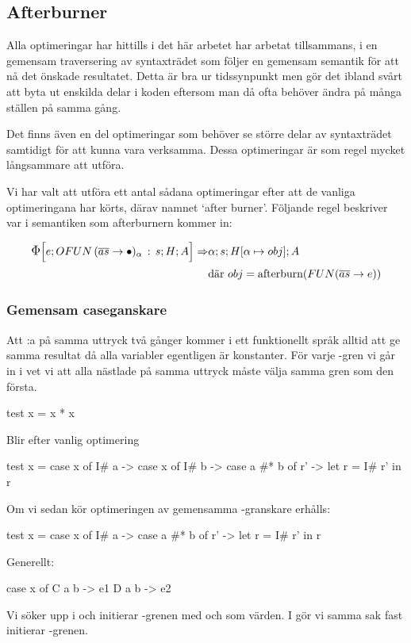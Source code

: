 \documentclass[../Optimise]{subfiles}
\begin{document}
\subsection{Afterburner}

Alla optimeringar har hittills i det här arbetet har arbetat tillsammans, i en gemensam
traversering av syntaxträdet som följer en gemensam semantik för att nå det önskade resultatet. 
Detta är bra ur tidssynpunkt men gör det ibland svårt att byta ut enskilda delar i koden
eftersom man då ofta behöver ändra på många ställen på samma gång.

Det finns även en del optimeringar som behöver se större delar av syntaxträdet
samtidigt för att kunna vara verksamma. Dessa optimeringar är som regel mycket långsammare att utföra.

Vi har valt att utföra ett antal sådana optimeringar efter att de vanliga
optimeringana har körts, därav namnet `after burner'. Följande regel beskriver
var i semantiken som afterburnern kommer in:

\begin{align*}
\CBNIRR{\cOFUN{\overline{as}}{\alpha}s}HAe \Rightarrow & \CBNMC{\alpha}{s}{\heap{\alpha}{obj}}A \\
 & \text{där } obj = \text{afterburn} (\FUN{\overline{as}}e)
\end{align*}

\subsubsection{Gemensam caseganskare}

Att :a på samma uttryck två gånger kommer i ett funktionellt språk alltid att ge
samma resultat då alla variabler egentligen är konstanter. För varje -gren
vi går in i vet vi att alla nästlade  på samma uttryck måste välja samma
gren som den första.

\begin{codeEx}
test x = x * x
\end{codeEx}

Blir efter vanlig optimering

\begin{codeEx}
test x = case x of
            I# a -> case x of
                I# b -> case a #* b of
                    r' -> let r = I# r'
                            in r
\end{codeEx}

Om vi sedan kör optimeringen av gemensamma -granskare erhålls:
\begin{codeEx}
test x = case x of
            I# a -> case a #* b of
                r' -> let r = I# r'
                    in r
\end{codeEx}

Generellt:
		\begin{codeEx}
case x of
    C a b -> e1
    D a b -> e2
\end{codeEx}

Vi söker upp  i  och initierar 
-grenen med  och  som värden. I  gör vi samma sak fast initierar -grenen.
\end{document}

